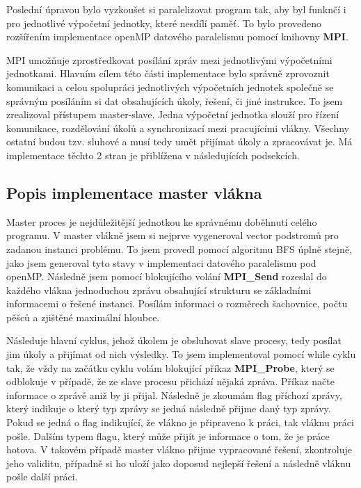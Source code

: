 \documentclass{article} \oddsidemargin=-5mm
\begin{document}
Poslední úpravou bylo vyzkoušet si paralelizovat program tak, aby byl funknčí i pro jednotlivé výpočetní jednotky, které nesdílí paměť. To bylo provedeno rozšířením implementace openMP datového paralelismu pomocí knihovny \textbf{MPI}.

MPI umožňuje zprostředkovat posílání zpráv mezi jednotlivými výpočetními jednotkami. Hlavním cílem této části implementace bylo správně zprovoznit komunikaci a celou spolupráci jednotlivých výpočetních jednotek společně se správným posíláním si dat obsahujících úkoly, řešení, či jiné instrukce. To jsem  zrealizoval přístupem master-slave. Jedna výpočetní jednotka slouží pro řízení komunikace, rozdělování úkolů a synchronizací mezi pracujícími vlákny. Všechny ostatní budou tzv. sluhové a musí tedy umět přijímat úkoly a zpracovávat je. Má implementace těchto 2 stran je přiblížena v následujících podsekcích.

\subsection{Popis implementace master vlákna}

Master proces je nejdůležitější jednotkou ke správnému doběhnutí celého programu. V master vlákně jsem si nejprve vygeneroval vector podstromů pro zadanou instanci problému. To jsem provedl pomocí algoritmu BFS úplně stejně, jako jsem generoval tyto stavy v implementaci datového paralelismu pod openMP. Následně jsem pomocí blokujícího volání \textbf{MPI\_Send} rozeslal do každého vlákna jednoduchou zprávu obsahující strukturu se základními informacemi o řešené instanci. Posílám informaci o rozměrech šachovnice, počtu pěšců a zjištěné maximální hloubce.

Následuje hlavní cyklus, jehož úkolem je obsluhovat slave procesy, tedy posílat jim úkoly a přijímat od nich výsledky. To jsem implementoval pomocí while cyklu tak, že vždy na začátku cyklu volám blokující příkaz \textbf{MPI\_Probe}, který se odblokuje v případě, že ze slave procesu přichází nějaká zpráva. Příkaz načte informace o zprávě aniž by ji přijal. Následně je zkoumám flag příchozí zprávy, který indikuje o který typ zprávy se jedná následně přijme daný typ zprávy. Pokud se jedná o flag indikující, že vlákno je připraveno k práci, tak vláknu práci pošle. Dalším typem flagu, který může přijít je informace o tom, že je práce hotova. V takovém případě master vlákno přijme vypracované řešení, zkontroluje jeho validitu, případně si ho uloží jako doposud nejlepší řešení a následně vláknu pošle další práci.
\end{document}
